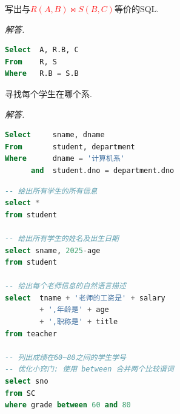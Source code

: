 \begin{example}
  写出与\textcolor{red}{$R(A,B) \bowtie S(B,C)$}等价的SQL.
\end{example}

\textit{ 解答. }
\begin{lstlisting}[language=SQL]
Select  A, R.B, C
From    R, S
Where   R.B = S.B
\end{lstlisting}

\begin{example}
  寻找每个学生在哪个系.
\end{example}

\textit{ 解答. }
\begin{lstlisting}[language=SQL]
Select     sname, dname
From       student, department
Where      dname = '计算机系'
      and  student.dno = department.dno
\end{lstlisting}

\begin{lstlisting}[language=SQL]
-- 给出所有学生的所有信息
select *
from student

-- 给出所有学生的姓名及出生日期
select sname, 2025-age
from student

-- 给出每个老师信息的自然语言描述
select  tname + '老师的工资是' + salary
        + ',年龄是' + age
        + ',职称是' + title
from teacher

-- 列出成绩在60~80之间的学生学号
-- 优化小窍门: 使用 between 合并两个比较谓词
select sno
from SC
where grade between 60 and 80
\end{lstlisting}
